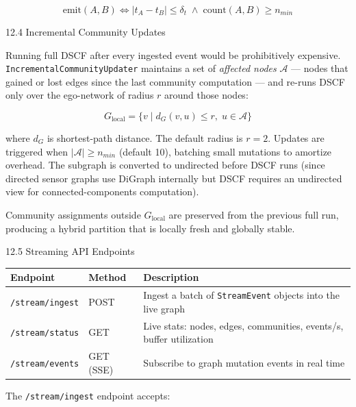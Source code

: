 \documentclass[10pt,journal,compsoc]{IEEEtran}
\begin{document}
\begin{equation}
\text{emit}(A, B) \iff |t_A - t_B| \leq \delta_t \;\wedge\; \text{count}(A, B) \geq n_{min}
\end{equation}

12.4 Incremental Community Updates

Running full DSCF after every ingested event would be prohi\-bitively expensive. \texttt{IncrementalCommunityUpdater} maintains a set of \textit{affected nodes} $\mathcal{A}$ — nodes that gained or lost edges since the last community computation — and re-runs DSCF only over the ego-network of radius $r$ around those nodes:

\begin{equation}
G_{\text{local}} = \{v \mid d_G(v, u) \leq r, \; u \in \mathcal{A}\}
\end{equation}

where $d_G$ is shortest-path distance. The default radius is $r = 2$. Updates are triggered when $|\mathcal{A}| \geq n_{min}$ (default 10), batching small mutations to amortize overhead. The subgraph is converted to undirected before DSCF runs (since directed sensor graphs use DiGraph internally but DSCF requires an undirected view for connected-components computation).

Community assignments outside $G_{\text{local}}$ are preserved from the previous full run, producing a hybrid partition that is locally fresh and globally stable.

12.5 Streaming API Endpoints

\begin{center}
{\footnotesize
\begin{tabularx}{\columnwidth}{|>{\raggedright\arraybackslash}X|>{\raggedright\arraybackslash}X|>{\raggedright\arraybackslash}X|}
\hline
Endpoint & Method & Description \\ \hline
\texttt{/stream/ingest} & POST & Ingest a batch of \texttt{StreamEvent} objects into the live graph \\ \hline
\texttt{/stream/status} & GET & Live stats: nodes, edges, communities, events/s, buffer utilization \\ \hline
\texttt{/stream/events} & GET (SSE) & Subscribe to graph mutation events in real time \\ \hline
\end{tabularx}
}
\end{center}

The \texttt{/stream/ingest} endpoint accepts:
\end{document}
